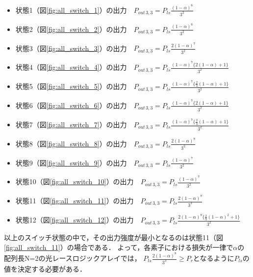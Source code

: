 \begin{itemize}
\item 状態1（図\ref{fig:all_switch_1}）の出力　$P_{out\,3,3}=P_{ls}\frac{(1-\alpha)^6}{3^2}$\\
\item 状態2（図\ref{fig:all_switch_2}）の出力　$P_{out\,3,3}=P_{ls}\frac{(1-\alpha)^6}{3^2}$\\
\item 状態3（図\ref{fig:all_switch_3}）の出力　$P_{out\,3,3}=P_{ls}\frac{2(1-\alpha)^7}{3^2}$\\
\item 状態4（図\ref{fig:all_switch_4}）の出力　$P_{out\,3,3}=P_{ls}\frac{(1-\alpha)^7\bigl\{2(1-\alpha)+1\bigl\}}{3^2}$\\
\item 状態5（図\ref{fig:all_switch_5}）の出力　$P_{out\,3,3}=P_{ls}\frac{(1-\alpha)^7\bigl\{\frac{2}{3}(1-\alpha)+1\bigl\}}{3^2}$\\
\item 状態6（図\ref{fig:all_switch_6}）の出力　$P_{out\,3,3}=P_{ls}\frac{(1-\alpha)^7\bigl\{2(1-\alpha)+1\bigl\}}{3^2}$\\
\item 状態7（図\ref{fig:all_switch_7}）の出力　$P_{out\,3,3}=P_{ls}\frac{(1-\alpha)^7\bigl\{\frac{2}{3}(1-\alpha)+1\bigl\}}{3^2}$\\
\item 状態8（図\ref{fig:all_switch_8}）の出力　$P_{out\,3,3}=P_{ls}\frac{2(1-\alpha)^8}{3^2}$\\
\item 状態9（図\ref{fig:all_switch_9}）の出力　$P_{out\,3,3}=P_{ls}\frac{(1-\alpha)^7}{3^2}$\\
\item 状態10（図\ref{fig:all_switch_10}）の出力　$P_{out\,3,3}=P_{ls}\frac{(1-\alpha)^7}{3^2}$\\
\item 状態11（図\ref{fig:all_switch_11}）の出力　$P_{out\,3,3}=P_{ls}\frac{2(1-\alpha)^8}{3^3}$\\
\item 状態12（図\ref{fig:all_switch_12}）の出力　$P_{out\,3,3}=P_{ls}\frac{2(1-\alpha)^8\bigl\{\frac{2}{3}(1-\alpha)^2+1\bigl\}}{3^2}$
\end{itemize}

以上のスイッチ状態の中で，その出力強度が最小となるのは状態11（図\ref{fig:all_switch_11}）の場合である．
よって，各素子における損失が一律で$\alpha$の
配列長N=2の光レースロジックアレイでは，
$P_{ls}\frac{2(1-\alpha)^8}{3^3} \geq P_{r}$となるように$P_{ls}$の値を決定する必要がある．

